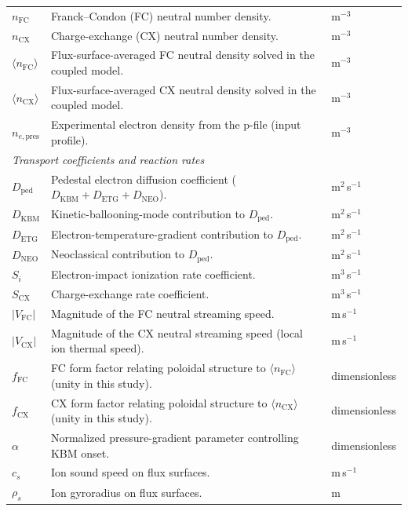 \documentclass[twocolumn,secnumarabic,amssymb, nobibnotes, aps, prd]{revtex4-2}
\begin{document}
\begin{table}[t]
\begin{ruledtabular}
\begin{tabular}{lll}
$n_{\mathrm{FC}}$ & Franck--Condon (FC) neutral number density. & m$^{-3}$ \\
$n_{\mathrm{CX}}$ & Charge-exchange (CX) neutral number density. & m$^{-3}$ \\
$\langle n_{\mathrm{FC}}\rangle$ & Flux-surface-averaged FC neutral density solved in the coupled model. & m$^{-3}$ \\
$\langle n_{\mathrm{CX}}\rangle$ & Flux-surface-averaged CX neutral density solved in the coupled model. & m$^{-3}$ \\
$n_{e,\mathrm{pres}}$ & Experimental electron density from the p-file (input profile). & m$^{-3}$ \\
\hline
\multicolumn{3}{l}{\textit{Transport coefficients and reaction rates}} \\
$D_{\mathrm{ped}}$ & Pedestal electron diffusion coefficient ($D_{\mathrm{KBM}}+D_{\mathrm{ETG}}+D_{\mathrm{NEO}}$). & m$^2$\,s$^{-1}$ \\
$D_{\mathrm{KBM}}$ & Kinetic-ballooning-mode contribution to $D_{\mathrm{ped}}$. & m$^2$\,s$^{-1}$ \\
$D_{\mathrm{ETG}}$ & Electron-temperature-gradient contribution to $D_{\mathrm{ped}}$. & m$^2$\,s$^{-1}$ \\
$D_{\mathrm{NEO}}$ & Neoclassical contribution to $D_{\mathrm{ped}}$. & m$^2$\,s$^{-1}$ \\
$S_i$ & Electron-impact ionization rate coefficient. & m$^3$\,s$^{-1}$ \\
$S_{\mathrm{CX}}$ & Charge-exchange rate coefficient. & m$^3$\,s$^{-1}$ \\
$|V_{\mathrm{FC}}|$ & Magnitude of the FC neutral streaming speed. & m\,s$^{-1}$ \\
$|V_{\mathrm{CX}}|$ & Magnitude of the CX neutral streaming speed (local ion thermal speed). & m\,s$^{-1}$ \\
$f_{\mathrm{FC}}$ & FC form factor relating poloidal structure to $\langle n_{\mathrm{FC}}\rangle$ (unity in this study). & dimensionless \\
$f_{\mathrm{CX}}$ & CX form factor relating poloidal structure to $\langle n_{\mathrm{CX}}\rangle$ (unity in this study). & dimensionless \\
$\alpha$ & Normalized pressure-gradient parameter controlling KBM onset. & dimensionless \\
$c_s$ & Ion sound speed on flux surfaces. & m\,s$^{-1}$ \\
$\rho_s$ & Ion gyroradius on flux surfaces. & m \\

\end{tabular}
\end{ruledtabular}
\end{table}
\end{document}
